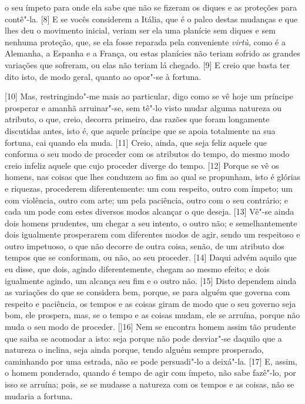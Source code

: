 o seu ímpeto para onde ela sabe que não se fizeram os diques e as
proteções para contê"-la. {[}8{]} E se vocês considerem a Itália, que é o
palco destas mudanças e que lhes deu o
movimento inicial, veriam ser ela uma planície sem diques e sem nenhuma
proteção, que, se ela fosse reparada pela conveniente \emph{virtù}, como
é a Alemanha, a Espanha e a França, ou estas planícies não teriam
sofrido as grandes variações que sofreram, ou elas não teriam lá
chegado. {[}9{]} E creio que basta ter dito isto, de modo geral, quanto
ao opor"-se à fortuna.

{[}10{]} Mas, restringindo"-me mais ao particular, digo como se vê hoje
um príncipe prosperar e amanhã arruinar"-se, sem tê"-lo visto mudar alguma
natureza ou atributo, o que, creio, decorra primeiro, das razões que
foram longamente discutidas antes, isto é,
que aquele príncipe que se apoia totalmente na sua fortuna, cai quando
ela muda. {[}11{]} Creio, ainda, que seja feliz aquele que conforma o
seu modo de proceder com os atributos do tempo, do mesmo modo creio
infeliz aquele que cujo proceder diverge do tempo. {[}12{]} Porque se vê
os homens, nas coisas que lhes conduzem ao fim ao qual se propunham,
isto é glórias e riquezas, procederem diferentemente: um com respeito,
outro com ímpeto; um com violência, outro com arte; um pela paciência, outro com o seu contrário; e cada
um pode com estes diversos modos alcançar o que deseja. {[}13{]} Vê"-se
ainda dois homens prudentes, um chegar a seu intento, o outro não; e
semelhantemente dois igualmente prosperarem com diferentes modos de
agir, sendo um respeitoso e outro impetuoso, o que não decorre de outra
coisa, senão, de um atributo dos tempos que se conformam, ou não, ao seu
proceder. {[}14{]} Daqui advém aquilo que eu disse, que dois, agindo
diferentemente, chegam ao mesmo efeito; e dois igualmente agindo, um
alcança seu fim e o outro não. {[}15{]} Disto dependem ainda as
variações do que se considera bem, porque, se para alguém que governa
com respeito e paciência, os tempos e as coisas giram de modo que o seu
governo seja bom, ele prospera, mas, se o tempo e as coisas mudam, ele
se arruína, porque não muda o seu modo de proceder. {[]}16{]} Nem se encontra homem assim tão prudente que saiba se acomodar a isto: seja porque não pode desviar"-se daquilo que a natureza o inclina, seja ainda porque, tendo alguém sempre prosperado, caminhando por uma estrada, não se pode persuadi"-lo a deixá"-la. {[}17{]} E, assim, o homem ponderado, quando é tempo de agir com ímpeto, não sabe fazê"-lo, por isso se arruína; pois, se se mudasse a natureza com os tempos e as coisas, não se mudaria a fortuna.

